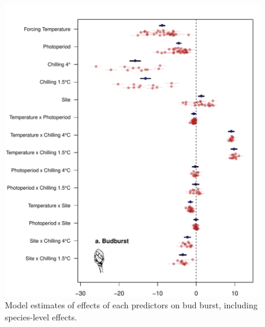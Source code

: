 \documentclass{article}
\begin{document}
\begin{figure}
\label{figS2}
\includegraphics[width=1\textwidth, page=1]{Fig1_bb_lo+sp} %
\caption{Model estimates of effects of each predictors on bud burst, including species-level effects.}
\end{figure}

\clearpage
\end{document}
